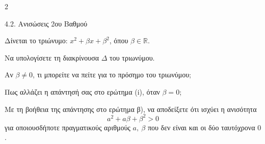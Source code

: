 \begin{ylh}{2}
    \item 4.2. Ανισώσεις 2ου Βαθμού
\end{ylh}
Δίνεται το τριώνυμο: $x^{2} + \beta x + \beta^{2}$, όπου $\beta\mathbb{\in \mathbb{R}}$.
\begin{alist}
\item Να υπολογίσετε τη διακρίνουσα $\Delta$ του τριωνύμου.
\item
\begin{rlist}
\item
  Αν $\beta \neq 0$, τι μπορείτε να πείτε για το πρόσημο του τριωνύμου;
\item
  Πως αλλάζει η απάντησή σας στο ερώτημα (i), όταν $\beta = 0$;
\item Με τη βοήθεια της απάντησης στο ερώτημα β), να αποδείξετε ότι ισχύει η ανισότητα
\begin{equation*}
a^{2} + a\beta + \beta^{2} > 0
\end{equation*}
για οποιουσδήποτε πραγματικούς αριθμούς $a,\ \beta$ που δεν είναι και οι δύο ταυτόχρονα $0$.
\end{rlist}
\end{alist}

